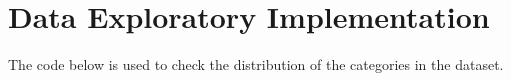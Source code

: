 \chapter{Data Exploratory Implementation}
The code below is used to check the distribution of the categories in the dataset.\\

